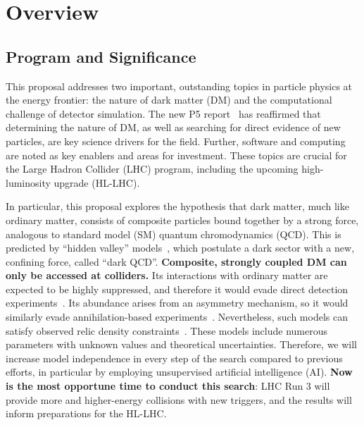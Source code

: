 \section{Overview}\label{sec:intro}

\subsection{Program and Significance}\label{subsec:program}

This proposal addresses two important, outstanding topics in particle physics at the energy frontier:
the nature of dark matter (DM) and the computational challenge of detector simulation.
The new P5 report~\cite{P5:2023} has reaffirmed that determining the nature of DM,
as well as searching for direct evidence of new particles, are key science drivers for the field.
Further, software and computing are noted as key enablers and areas for investment.
These topics are crucial for the Large Hadron Collider (LHC) program,
including the upcoming high-luminosity upgrade (HL-LHC).

In particular, this proposal explores the hypothesis that dark matter, much like ordinary matter,
consists of composite particles bound together by a strong force, analogous to standard model (SM) quantum chromodynamics (QCD).
This is predicted by ``hidden valley'' models~\cite{Strassler:2006im}, which postulate a dark sector with a new, confining force, called ``dark QCD''.
\textbf{Composite, strongly coupled DM can only be accessed at colliders.}
Its interactions with ordinary matter are expected to be highly suppressed,
and therefore it would evade direct detection experiments~\cite{Cohen:2017pzm}.
Its abundance arises from an asymmetry mechanism, so it would similarly evade annihilation-based experiments~\cite{Petraki:2013wwa}.
Nevertheless, such models can satisfy observed relic density constraints~\cite{Beauchesne:2018myj,Beauchesne:2019ato}.
These models include numerous parameters with unknown values and theoretical uncertainties.
Therefore, we will increase model independence in every step of the search compared to previous efforts,
in particular by employing unsupervised artificial intelligence (AI).
\textbf{Now is the most opportune time to conduct this search}:
LHC Run 3 will provide more and higher-energy collisions with new triggers,
and the results will inform preparations for the HL-LHC.

